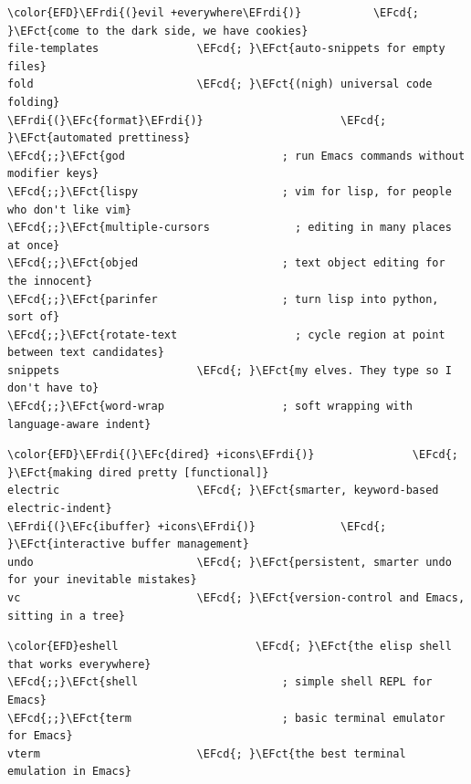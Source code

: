 \documentclass{scrartcl}
\newcommand{\EFct}[1]{\textcolor{EFct}{#1}} %
\newcommand{\EFc}[1]{\textcolor{EFc}{#1}} %
\newcommand{\EFcd}[1]{\textcolor{EFcd}{#1}} %
\newcommand{\EFrdi}[1]{\textcolor{EFrdi}{#1}} %
\begin{document}
\begin{enumerate}
\begin{Code}
\begin{Verbatim}[]
\color{EFD}\EFrdi{(}evil +everywhere\EFrdi{)}           \EFcd{; }\EFct{come to the dark side, we have cookies}
file-templates               \EFcd{; }\EFct{auto-snippets for empty files}
fold                         \EFcd{; }\EFct{(nigh) universal code folding}
\EFrdi{(}\EFc{format}\EFrdi{)}                     \EFcd{; }\EFct{automated prettiness}
\EFcd{;;}\EFct{god                        ; run Emacs commands without modifier keys}
\EFcd{;;}\EFct{lispy                      ; vim for lisp, for people who don't like vim}
\EFcd{;;}\EFct{multiple-cursors             ; editing in many places at once}
\EFcd{;;}\EFct{objed                      ; text object editing for the innocent}
\EFcd{;;}\EFct{parinfer                   ; turn lisp into python, sort of}
\EFcd{;;}\EFct{rotate-text                  ; cycle region at point between text candidates}
snippets                     \EFcd{; }\EFct{my elves. They type so I don't have to}
\EFcd{;;}\EFct{word-wrap                  ; soft wrapping with language-aware indent}
\end{Verbatim}
\end{Code}

\begin{Code}
\begin{Verbatim}[]
\color{EFD}\EFrdi{(}\EFc{dired} +icons\EFrdi{)}               \EFcd{; }\EFct{making dired pretty [functional]}
electric                     \EFcd{; }\EFct{smarter, keyword-based electric-indent}
\EFrdi{(}\EFc{ibuffer} +icons\EFrdi{)}             \EFcd{; }\EFct{interactive buffer management}
undo                         \EFcd{; }\EFct{persistent, smarter undo for your inevitable mistakes}
vc                           \EFcd{; }\EFct{version-control and Emacs, sitting in a tree}
\end{Verbatim}
\end{Code}

\begin{Code}
\begin{Verbatim}[]
\color{EFD}eshell                     \EFcd{; }\EFct{the elisp shell that works everywhere}
\EFcd{;;}\EFct{shell                      ; simple shell REPL for Emacs}
\EFcd{;;}\EFct{term                       ; basic terminal emulator for Emacs}
vterm                        \EFcd{; }\EFct{the best terminal emulation in Emacs}
\end{Verbatim}
\end{Code}


\end{enumerate}
\end{document}
